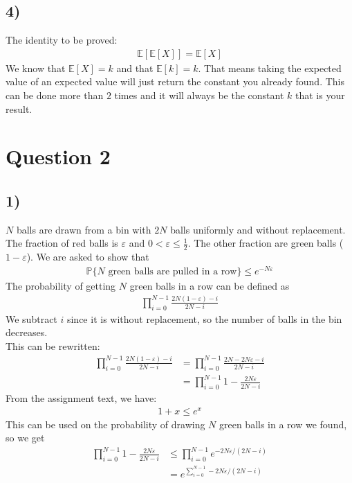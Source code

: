 \documentclass[a4paper]{article}
\begin{document}
\subsection*{4)}
The identity to be proved:
\begin{align*}
\mathbb{E}[\mathbb{E}[X]]=\mathbb{E}[X]
\end{align*}
We know that $\mathbb{E}[X]=k$ and that $\mathbb{E}[k]=k$. That means taking the expected value of an expected value will just return the constant you already found. This can be done more than $2$ times and it will always be the constant $k$ that is your result.

\newpage
\section*{Question 2}
\subsection*{1)}
$N$ balls are drawn from a bin with $2N$ balls uniformly and without replacement. The fraction of red balls is $\varepsilon$ and $0<\varepsilon\leq \frac{1}{2}$. The other fraction are green balls ($1-\varepsilon$). We are asked to show that
\begin{align*}
\mathbb{P}\{\mbox{$N$ green balls are pulled in a row}\}\leq e^{-N\varepsilon}
\end{align*}
The probability of getting $N$ green balls in a row can be defined as
\begin{align*}
\prod_{i=0}^{N-1} \frac{2N(1-\varepsilon)-i}{2N-i}
\end{align*}
We subtract $i$ since it is without replacement, so the number of balls in the bin decreases. \\
This can be rewritten:
\begin{align*}
\prod_{i=0}^{N-1} \frac{2N(1-\varepsilon)-i}{2N-i} &= \prod_{i=0}^{N-1} \frac{2N-2N\varepsilon-i}{2N-i} \\
&= \prod_{i=0}^{N-1} 1-\frac{2N\varepsilon}{2N-i}
\end{align*}
From the assignment text, we have:
\begin{align*}
1+x\leq e^x
\end{align*}
This can be used on the probability of drawing $N$ green balls in a row we found, so we get
\begin{align*}
\prod_{i=0}^{N-1} 1-\frac{2N\varepsilon}{2N-i}&\leq \prod_{i=0}^{N-1} e^{-2N\varepsilon/(2N-i)} \\
&= e^{\sum_{i=0}^{N-1}-2N\varepsilon/(2N-i)}
\end{align*}
\end{document}
